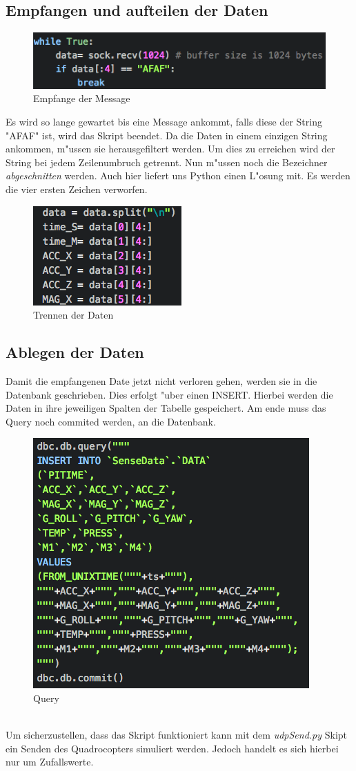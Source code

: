 \documentclass[oneside, a4paper, 11pt]{report}
\begin{document}
			\subsection{Empfangen und aufteilen der Daten}
				\begin{figure}[h!]
					\centering
					\includegraphics[width=0.65\linewidth]{img/whilerec.png}
					\caption{Empfange der Message\label{recv}}
				\end{figure}
				Es wird so lange gewartet bis eine Message ankommt, falls diese der String "AFAF" ist, wird das Skript beendet. Da die Daten in einem einzigen String ankommen, m"ussen sie herausgefiltert werden. Um dies zu erreichen wird der String bei jedem Zeilenumbruch getrennt. Nun m"ussen noch die Bezeichner \textit{abgeschnitten} werden. Auch hier liefert uns Python einen L"osung mit. Es werden die vier ersten Zeichen verworfen.
				\begin{figure}[h!]
					\centering
					\includegraphics[width=0.3\linewidth]{img/trenn.png}
					\caption{Trennen der Daten\label{trenn_D}}
				\end{figure}
			\newpage
			\subsection{Ablegen der Daten}
				Damit die empfangenen Date jetzt nicht verloren gehen, werden sie in die Datenbank geschrieben. Dies erfolgt "uber einen INSERT. Hierbei werden die Daten in ihre jeweiligen Spalten der Tabelle gespeichert. Am ende muss das Query noch commited werden, an die Datenbank.
				\begin{figure}[h!]
					\centering
					\includegraphics[width=0.5\linewidth]{img/query.png}
					\caption{Query\label{qry}}
				\end{figure}\\	
				Um sicherzustellen, dass das Skript funktioniert kann mit dem \textit{udpSend.py} Skipt ein Senden des Quadrocopters simuliert werden. Jedoch handelt es sich hierbei nur um Zufallswerte. 
\end{document}
